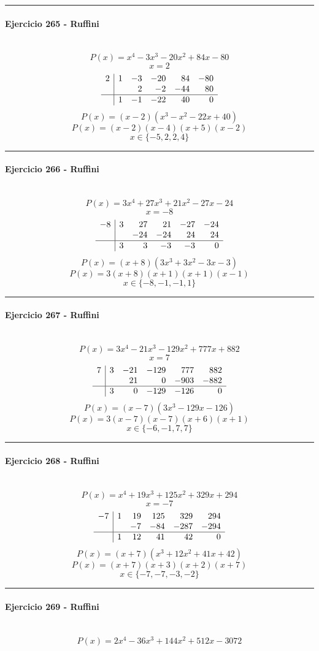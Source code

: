 \documentclass[10pt,a4paper]{article}
\newcommand{\res}[1]{\paragraph{#1}\mbox{}\\[-1.2em]}
\begin{document}
\vspace{1mm}\hrule\vspace{2mm}
\res{Ejercicio 265 - Ruffini}
\[ P(x)=x^{4} - 3 x^{3} - 20 x^{2} + 84 x - 80 \]
\[ x=2 \]
\[\begin{array}{r|rrrrr}2 & 1 & -3 & -20 & 84 & -80\\  &  & 2 & -2 & -44 & 80\\\hline  & 1 & -1 & -22 & 40 & 0\end{array}\]
\[ P(x)=(x-2)(x^{3} - x^{2} - 22 x + 40) \]
\[ P(x)=(x-2)(x-4)(x+5)(x-2) \]
\[ \boxed{x\in\{-5,2,2,4\}} \]
\vspace{1mm}\hrule\vspace{2mm}
\res{Ejercicio 266 - Ruffini}
\[ P(x)=3 x^{4} + 27 x^{3} + 21 x^{2} - 27 x - 24 \]
\[ x=-8 \]
\[\begin{array}{r|rrrrr}-8 & 3 & 27 & 21 & -27 & -24\\  &  & -24 & -24 & 24 & 24\\\hline  & 3 & 3 & -3 & -3 & 0\end{array}\]
\[ P(x)=(x+8)(3 x^{3} + 3 x^{2} - 3 x - 3) \]
\[ P(x)=3(x+8)(x+1)(x+1)(x-1) \]
\[ \boxed{x\in\{-8,-1,-1,1\}} \]
\vspace{1mm}\hrule\vspace{2mm}
\res{Ejercicio 267 - Ruffini}
\[ P(x)=3 x^{4} - 21 x^{3} - 129 x^{2} + 777 x + 882 \]
\[ x=7 \]
\[\begin{array}{r|rrrrr}7 & 3 & -21 & -129 & 777 & 882\\  &  & 21 & 0 & -903 & -882\\\hline  & 3 & 0 & -129 & -126 & 0\end{array}\]
\[ P(x)=(x-7)(3 x^{3} - 129 x - 126) \]
\[ P(x)=3(x-7)(x-7)(x+6)(x+1) \]
\[ \boxed{x\in\{-6,-1,7,7\}} \]
\vspace{1mm}\hrule\vspace{2mm}
\res{Ejercicio 268 - Ruffini}
\[ P(x)=x^{4} + 19 x^{3} + 125 x^{2} + 329 x + 294 \]
\[ x=-7 \]
\[\begin{array}{r|rrrrr}-7 & 1 & 19 & 125 & 329 & 294\\  &  & -7 & -84 & -287 & -294\\\hline  & 1 & 12 & 41 & 42 & 0\end{array}\]
\[ P(x)=(x+7)(x^{3} + 12 x^{2} + 41 x + 42) \]
\[ P(x)=(x+7)(x+3)(x+2)(x+7) \]
\[ \boxed{x\in\{-7,-7,-3,-2\}} \]
\vspace{1mm}\hrule\vspace{2mm}
\res{Ejercicio 269 - Ruffini}
\[ P(x)=2 x^{4} - 36 x^{3} + 144 x^{2} + 512 x - 3072 \]
\end{document}
